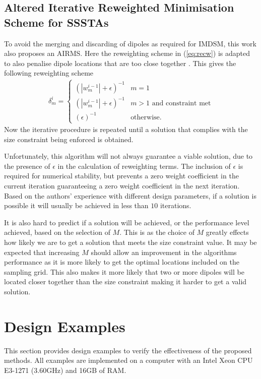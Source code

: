 \documentclass[10pt,final]{IEEEtran}
\begin{document}
\subsection{Altered Iterative Reweighted Minimisation Scheme for SSSTAs}\label{sub:reweighted}
To avoid the merging and discarding of dipoles as required for IMDSM, this work also proposes an AIRMS.  Here the reweighting scheme in (\ref{eq:recw}) is adapted to also penalise dipole locations that are too close together \cite{Hawes14c}.  This gives the following reweighting scheme
  \begin{eqnarray}
 \delta_{m}^{i} =
 \begin{cases}
 (|w_{m}^{i-1}|+\epsilon)^{-1} & m = 1 \\
 (|w_{m}^{i-1}|+\epsilon)^{-1} & m > 1 \text{ and constraint met} \\
 (\epsilon)^{-1} & \text{otherwise}.
 \end{cases}
  \end{eqnarray}
Now the iterative procedure is repeated until a solution that complies with the size constraint being enforced is obtained.

Unfortunately, this algorithm will not always guarantee a viable
solution, due to the presence of $\epsilon$ in the calculation of
reweighting terms. The inclusion of $\epsilon$ is required for
numerical stability, but prevents a zero weight coefficient in the
current iteration guaranteeing a zero weight coefficient in the next
iteration. Based on the authors' experience with different design
parameters, if a solution is possible it will usually be achieved in
less than $10$ iterations.

It is also hard to predict if a solution will be achieved, or the performance level achieved, based on the
selection of $M$.  This is as the choice of $M$ greatly effects how likely we are to get a solution that
meets the size constraint value.  It may be expected that increasing $M$ should allow an improvement in the
algorithms performance as it is more likely to get the optimal locations included on the sampling grid.
This also makes it more likely that two or more dipoles will be located closer together than the
size constraint making it harder to get a valid solution.

\section{Design Examples}\label{sec:sim}
This section provides design examples to verify the effectiveness of the proposed methods.  All examples are implemented on a computer with
an Intel Xeon CPU E3-1271 (3.60GHz) and 16GB of RAM.
\end{document}
